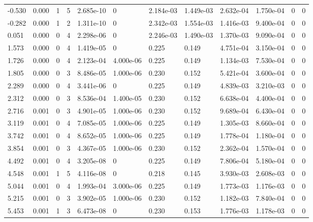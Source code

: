 \documentclass[preview]{standalone}
\begin{document}
{{\begin{tabular}{L{1.2cm}C{1.2cm} C{0.3cm}C{0.5cm} C{1.4cm}C{1.4cm} C{1.4cm}C{1.4cm} C{1.6cm}C{1.6cm} C{1.6cm}C{1.6cm}}
  -0.530  &  0.000  & 1     &  5 &  2.685e-10  & 0  &  2.184e-03&   1.449e-03& 2.632e-04 & 1.750e-04   &  0 & 0  \\ 
  -0.282  &  0.000  & 1     &  2 &  1.311e-10  & 0  &  2.342e-03&   1.554e-03& 1.416e-03 & 9.400e-04   &  0 & 0  \\ 
  0.051  &  0.000  & 0     &  4 &  2.298e-06  & 0  &  2.246e-03&   1.490e-03& 1.370e-03 & 9.090e-04   &  0 & 0  \\ 
  1.573  &  0.000  & 0     &  4 &  1.419e-05  & 0  &  0.225&   0.149& 4.751e-04 & 3.150e-04   &  0 & 0  \\ 
  1.726  &  0.000  & 0     &  4 &  2.123e-04  & 4.000e-06  &  0.225&   0.149& 1.134e-03 & 7.530e-04   &  0 & 0  \\ 
  1.805  &  0.000  & 0     &  3 &  8.486e-05  & 1.000e-06  &  0.230&   0.152& 5.421e-04 & 3.600e-04   &  0 & 0  \\ 
  2.289  &  0.000  & 0     &  4 &  3.441e-06  & 0  &  0.225&   0.149& 4.839e-03 & 3.210e-03   &  0 & 0  \\ 
  2.312  &  0.000  & 0     &  3 &  8.536e-04  & 1.400e-05  &  0.230&   0.152& 6.638e-04 & 4.400e-04   &  0 & 0  \\ 
  2.716  &  0.001  & 0     &  3 &  4.901e-05  & 1.000e-06  &  0.230&   0.152& 9.689e-04 & 6.430e-04   &  0 & 0  \\ 
  3.119  &  0.001  & 0     &  4 &  7.085e-05  & 1.000e-06  &  0.225&   0.149& 1.305e-03 & 8.660e-04   &  0 & 0  \\ 
  3.742  &  0.001  & 0     &  4 &  8.652e-05  & 1.000e-06  &  0.225&   0.149& 1.778e-04 & 1.180e-04   &  0 & 0  \\ 
  3.854  &  0.001  & 0     &  3 &  4.367e-05  & 1.000e-06  &  0.230&   0.152& 2.362e-04 & 1.570e-04   &  0 & 0  \\ 
  4.492  &  0.001  & 0     &  4 &  3.205e-08  & 0  &  0.225&   0.149& 7.806e-04 & 5.180e-04   &  0 & 0  \\ 
  4.548  &  0.001  & 1     &  5 &  4.116e-08  & 0  &  0.218&   0.145& 3.930e-03 & 2.608e-03   &  0 & 0  \\ 
  5.044  &  0.001  & 0     &  4 &  1.993e-04  & 3.000e-06  &  0.225&   0.149& 1.773e-03 & 1.176e-03   &  0 & 0  \\ 
  5.215  &  0.001  & 0     &  3 &  3.902e-05  & 1.000e-06  &  0.230&   0.152& 1.182e-03 & 7.840e-04   &  0 & 0  \\ 
  5.453  &  0.001  & 1     &  3 &  6.473e-08  & 0  &  0.230&   0.153& 1.776e-03 & 1.178e-03   &  0 & 0  \\ 

\end{tabular}}}
\end{document}
